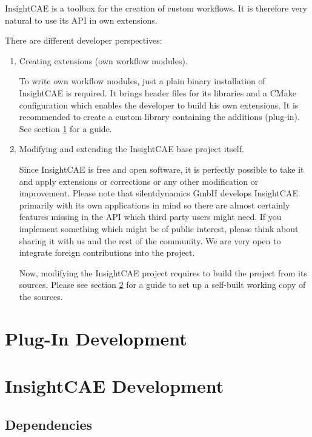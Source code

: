 InsightCAE is a toolbox for the creation of custom workflows.
It is therefore very natural to use its API in own extensions.

There are different developer perspectives:
\begin{enumerate}
\item Creating extensions (own workflow modules).

To write own workflow modules, just a plain binary installation of InsightCAE is required. 
It brings header files for its libraries and a CMake configuration which enables the developer to build his own extensions.
It is recommended to create a custom library containing the additions (plug-in).
See section \ref{sec:plugins} for a guide.

\item Modifying and extending the InsightCAE base project itself.

Since InsightCAE is free and open software, it is perfectly possible to take it and apply extensions or corrections or any other modification or improvement.
Please note that silentdynamics GmbH develops InsightCAE primarily with its own applications in mind so there are almost certainly features missing in the API which third party users might need.
If you implement something which might be of public interest, please think about sharing it with us and the rest of the community. 
We are very open to integrate foreign contributions into the project.

Now, modifying the InsightCAE project requires to build the project from its sources. 
Please see section \ref{sec:insightcae_dev} for a guide to set up a self-built working copy of the sources.
\end{enumerate}

\section{Plug-In Development}
\label{sec:plugins}


\section{InsightCAE Development}
\label{sec:insightcae_dev}

\subsection{Dependencies}

